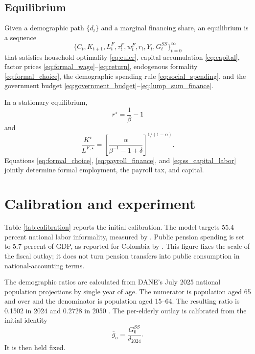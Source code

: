 \documentclass[12pt]{article}
\begin{document}
\subsection{Equilibrium}

Given a demographic path $\{d_t\}$ and a marginal financing share, an
equilibrium is a sequence
\[
  \{C_t,K_{t+1},L_t^F,\tau_t^F,w_t^F,r_t,Y_t,G_t^{SS}\}_{t=0}^{\infty}
\]
that satisfies household optimality \eqref{eq:euler}, capital accumulation
\eqref{eq:capital}, factor prices \eqref{eq:formal_wage}--\eqref{eq:return},
endogenous formality \eqref{eq:formal_choice}, the demographic spending rule
\eqref{eq:social_spending}, and the government budget
\eqref{eq:government_budget}--\eqref{eq:lump_sum_finance}.

In a stationary equilibrium,
\begin{equation}
  r^\star=\frac{1}{\beta}-1
  \label{eq:ss_return}
\end{equation}
and
\begin{equation}
  \frac{K^\star}{L^{F,\star}}
  =
  \left[
    \frac{\alpha}{
      \beta^{-1}-1+\delta
    }
  \right]^{1/(1-\alpha)}.
  \label{eq:ss_capital_labor}
\end{equation}
Equations \eqref{eq:formal_choice},
\eqref{eq:payroll_finance}, and
\eqref{eq:ss_capital_labor} jointly determine formal employment, the payroll
tax, and capital.

\section{Calibration and experiment}

Table \ref{tab:calibration} reports the initial calibration. The model targets
55.4 percent national labor informality, measured by
\citet{DANE2025Informality}. Public pension spending is set to 5.7 percent of
GDP, as reported for Colombia by \citet{OECD2023Colombia}. This figure fixes
the scale of the fiscal outlay; it does not turn pension transfers into public
consumption in national-accounting terms.

The demographic ratios are calculated from DANE's July 2025 national
population projections by single year of age. The numerator is population aged
65 and over and the denominator is population aged 15--64. The resulting ratio
is 0.1502 in 2024 and 0.2728 in 2050 \citep{DANE2025Projections}. The
per-elderly outlay is calibrated from the initial identity
\[
  \bar g_o=\frac{G_0^{SS}}{d_{2024}}.
\]
It is then held fixed.
\end{document}
